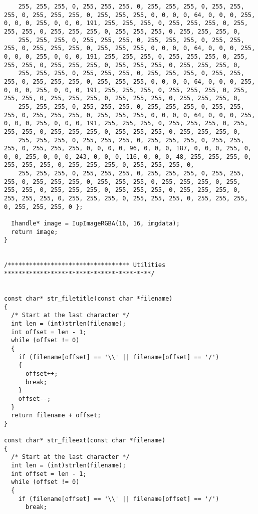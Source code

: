 \documentclass{ctexart}
\begin{document}
\begin{lstlisting}
    255, 255, 255, 0, 255, 255, 255, 0, 255, 255, 255, 0, 255, 255, 255, 0, 255, 255, 255, 0, 255, 255, 255, 0, 0, 0, 0, 64, 0, 0, 0, 255, 0, 0, 0, 255, 0, 0, 0, 191, 255, 255, 255, 0, 255, 255, 255, 0, 255, 255, 255, 0, 255, 255, 255, 0, 255, 255, 255, 0, 255, 255, 255, 0,
    255, 255, 255, 0, 255, 255, 255, 0, 255, 255, 255, 0, 255, 255, 255, 0, 255, 255, 255, 0, 255, 255, 255, 0, 0, 0, 0, 64, 0, 0, 0, 255, 0, 0, 0, 255, 0, 0, 0, 191, 255, 255, 255, 0, 255, 255, 255, 0, 255, 255, 255, 0, 255, 255, 255, 0, 255, 255, 255, 0, 255, 255, 255, 0,
    255, 255, 255, 0, 255, 255, 255, 0, 255, 255, 255, 0, 255, 255, 255, 0, 255, 255, 255, 0, 255, 255, 255, 0, 0, 0, 0, 64, 0, 0, 0, 255, 0, 0, 0, 255, 0, 0, 0, 191, 255, 255, 255, 0, 255, 255, 255, 0, 255, 255, 255, 0, 255, 255, 255, 0, 255, 255, 255, 0, 255, 255, 255, 0,
    255, 255, 255, 0, 255, 255, 255, 0, 255, 255, 255, 0, 255, 255, 255, 0, 255, 255, 255, 0, 255, 255, 255, 0, 0, 0, 0, 64, 0, 0, 0, 255, 0, 0, 0, 255, 0, 0, 0, 191, 255, 255, 255, 0, 255, 255, 255, 0, 255, 255, 255, 0, 255, 255, 255, 0, 255, 255, 255, 0, 255, 255, 255, 0,
    255, 255, 255, 0, 255, 255, 255, 0, 255, 255, 255, 0, 255, 255, 255, 0, 255, 255, 255, 0, 0, 0, 0, 96, 0, 0, 0, 187, 0, 0, 0, 255, 0, 0, 0, 255, 0, 0, 0, 243, 0, 0, 0, 116, 0, 0, 0, 48, 255, 255, 255, 0, 255, 255, 255, 0, 255, 255, 255, 0, 255, 255, 255, 0,
    255, 255, 255, 0, 255, 255, 255, 0, 255, 255, 255, 0, 255, 255, 255, 0, 255, 255, 255, 0, 255, 255, 255, 0, 255, 255, 255, 0, 255, 255, 255, 0, 255, 255, 255, 0, 255, 255, 255, 0, 255, 255, 255, 0, 255, 255, 255, 0, 255, 255, 255, 0, 255, 255, 255, 0, 255, 255, 255, 0, 255, 255, 255, 0 };

  Ihandle* image = IupImageRGBA(16, 16, imgdata);
  return image;
}


/********************************** Utilities *****************************************/


const char* str_filetitle(const char *filename)
{
  /* Start at the last character */
  int len = (int)strlen(filename);
  int offset = len - 1;
  while (offset != 0)
  {
    if (filename[offset] == '\\' || filename[offset] == '/')
    {
      offset++;
      break;
    }
    offset--;
  }
  return filename + offset;
}

const char* str_fileext(const char *filename)
{
  /* Start at the last character */
  int len = (int)strlen(filename);
  int offset = len - 1;
  while (offset != 0)
  {
    if (filename[offset] == '\\' || filename[offset] == '/')
      break;


\end{lstlisting}
\end{document}
